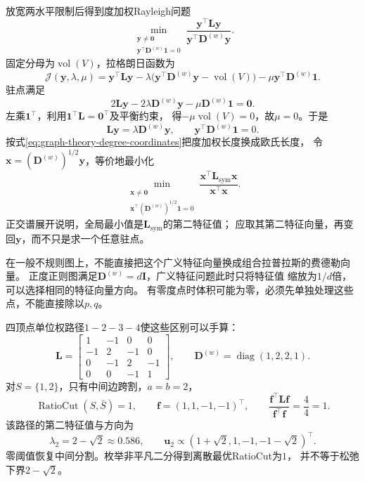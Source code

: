 放宽两水平限制后得到度加权Rayleigh问题
\begin{equation}
  \min_{\substack{\bm y\neq\bm0\\
       \bm y^\top\bm D^{(w)}\bm1=0}}
       \frac{\bm y^\top\bm L\bm y}{\bm y^\top\bm D^{(w)}\bm y}.
  \label{eq:graph-theory-normalized-cut-relaxation}
\end{equation}
固定分母为\(\operatorname{vol}(V)\)，拉格朗日函数为
\[
  \mathcal J(\bm y,\lambda,\mu)
  =\bm y^\top\bm L\bm y
  -\lambda\bigl(\bm y^\top\bm D^{(w)}\bm y-\operatorname{vol}(V)\bigr)
  -\mu\bm y^\top\bm D^{(w)}\bm1.
\]
驻点满足
\[
  2\bm L\bm y-2\lambda\bm D^{(w)}\bm y-\mu\bm D^{(w)}\bm1=\bm0.
\]
左乘\(\bm1^\top\)，利用\(\bm1^\top\bm L=\bm0^\top\)及平衡约束，
得\(-\mu\operatorname{vol}(V)=0\)，故\(\mu=0\)。于是
\begin{equation}
  \bm L\bm y=\lambda\bm D^{(w)}\bm y,\qquad
  \bm y^\top\bm D^{(w)}\bm1=0.
  \label{eq:graph-theory-normalized-cut-generalized-eigenproblem}
\end{equation}
按式\eqref{eq:graph-theory-degree-coordinates}把度加权长度换成欧氏长度，
令\(\bm x=(\bm D^{(w)})^{1/2}\bm y\)，等价地最小化
\[
  \min_{\substack{\bm x\neq\bm0\\
     \bm x^\top(\bm D^{(w)})^{1/2}\bm1=0}}
     \frac{\bm x^\top\bm L_{\mathrm{sym}}\bm x}{\bm x^\top\bm x}.
\]
正交谱展开说明，全局最小值是\(\bm L_{\mathrm{sym}}\)的第二特征值；
应取其第二特征向量，再变回\(\bm y\)，而不只是求一个任意驻点。

在一般不规则图上，不能直接把这个广义特征向量换成组合拉普拉斯的费德勒向量。
正度正则图满足\(\bm D^{(w)}=d\bm I\)，广义特征问题此时只将特征值
缩放为\(1/d\)倍，可以选择相同的特征向量方向。
有零度点时体积可能为零，必须先单独处理这些点，不能直接除以\(p,q\)。

四顶点单位权路径\(1-2-3-4\)使这些区别可以手算：
\[
  \bm L=
  \begin{bmatrix}
    1&-1&0&0\\
    -1&2&-1&0\\
    0&-1&2&-1\\
    0&0&-1&1
  \end{bmatrix},
  \qquad \bm D^{(w)}=\operatorname{diag}(1,2,2,1).
\]
对\(S=\{1,2\}\)，只有中间边跨割，\(a=b=2\)，
\[
  \operatorname{RatioCut}(S,\bar S)=1,\qquad
  \bm f=(1,1,-1,-1)^\top,\qquad
  \frac{\bm f^\top\bm L\bm f}{\bm f^\top\bm f}=\frac44=1.
\]
该路径的第二特征值与方向为
\[
  \lambda_2=2-\sqrt2\approx0.586,\qquad
  \bm u_2\propto(1+\sqrt2,1,-1,-1-\sqrt2)^\top.
\]
零阈值恢复中间分割。枚举非平凡二分得到离散最优RatioCut为\(1\)，
并不等于松弛下界\(2-\sqrt2\)。

